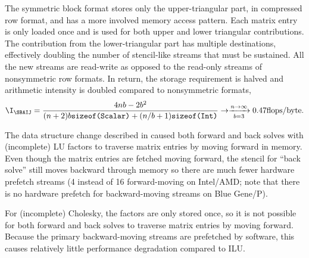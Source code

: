 The symmetric block format {\SBAIJ} stores only the upper-triangular part, in compressed row format, and has a more involved memory access pattern.
Each matrix entry is only loaded once and is used for both upper and lower triangular contributions.
The contribution from the lower-triangular part has multiple destinations, effectively doubling the number of stencil-like streams that must be sustained.
All the new streams are read-write as opposed to the read-only streams of nonsymmetric row formats.
In return, the storage requirement is halved and arithmetic intensity is doubled compared to nonsymmetric formats,
\begin{align*}
  \I_{\SBAIJ} = \frac{4nb - 2b^2}{(n+2)b\texttt{sizeof(Scalar)} + (n/b+1)\texttt{sizeof(Int)}} \to \xrightarrow[b=3]{n\to\infty} 0.47 \text{flops/byte} .
\end{align*}

The data structure change described in \citet{smith2010sparse} caused both forward and back solves with (incomplete) LU factors to traverse matrix entries by moving forward in memory.
Even though the matrix entries are fetched moving forward, the stencil for ``back solve'' still moves backward through memory so there are much fewer hardware prefetch streams (4 instead of 16 forward-moving on Intel/AMD; note that there is no hardware prefetch for backward-moving streams on Blue Gene/P).

For (incomplete) Cholesky, the factors are only stored once, so it is not possible for both forward and back solves to traverse matrix entries by moving forward.
Because the primary backward-moving streams are prefetched by software, this causes relatively little performance degradation compared to ILU.


